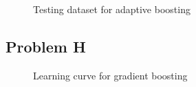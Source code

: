 \documentclass[12pt]{article} %
\begin{document}
\begin{figure}[H]
	\vspace{-10mm}
	\caption{Testing dataset for adaptive boosting}
\end{figure}



\subsection{Problem H}

\begin{figure}[H]
	\vspace{-10mm}
	\caption{Learning curve for gradient boosting}
\end{figure}
\end{document}
